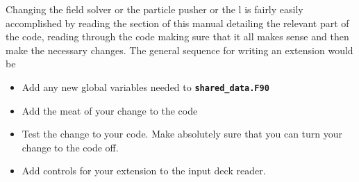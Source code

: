\documentclass[12pt]{article}
\newcommand{\inlinecode}[1]{{\color{warwickred} \bf\texttt{#1}}}
\begin{document}
Changing the field solver or the particle pusher or the l is fairly easily
accomplished by reading the section of this manual detailing the relevant part
of the code, reading through the code making sure that it all makes sense and
then make the necessary changes. The general sequence for writing an extension
would be
\begin{itemize}
\item Add any new global variables needed to \inlinecode{shared\_data.F90}
\item Add the meat of your change to the code
\item Test the change to your code. Make absolutely sure that you can turn your
  change to the code off.
\item Add controls for your extension to the input deck reader.
\end{itemize}
\end{document}
